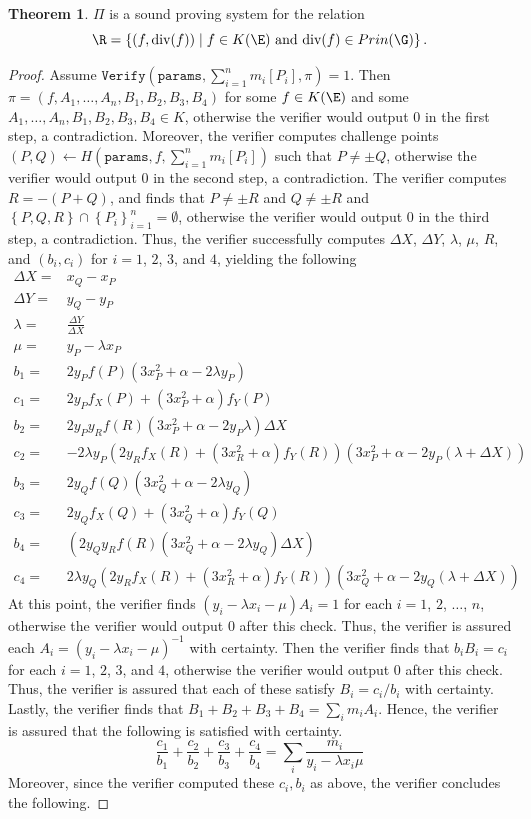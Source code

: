 \documentclass[11pt,letterpaper]{article}
\newcommand{\free}[1]{{\textcolor{red}{#1}}}
\theoremstyle{definition}
\newtheorem{theorem}{Theorem}
\newcommand{\6}{\mathbf}
\newcommand{\7}{\mathcal}
\begin{document}
\begin{theorem}\label{thm:DivisorSoundness}
$\Pi$ is a sound proving system for the relation 
$$\R = \left\{(f, \text{div}(f)) \mid f \in K(\E) \text{ and } \text{div}(f) \in Prin(\G) \right\}.$$
\end{theorem}
\begin{proof}
Assume $\texttt{Verify}(\texttt{params}, \sum_{i=1}^{n} m_i [P_i], \pi) = 1$. Then $\pi = (f,  A_1, \ldots, A_n, B_1, B_2, B_3, B_4)$ for some $f \in K(\E)$ and some $A_1, \ldots, A_n, B_1, B_2, B_3, B_4 \in K$, otherwise the verifier would output $0$ in the first step, a contradiction. Moreover, the verifier computes challenge points $(P, Q) \leftarrow H(\texttt{params}, f, \sum_{i=1}^{n} m_i [P_i])$ such that $P \neq \pm Q$, otherwise the verifier would output $0$ in the second step, a contradiction.  The verifier computes $R = -(P + Q)$, and finds that $P \neq \pm R$ and $Q \neq \pm R$ and $\left\{P, Q, R\right\} \cap \left\{P_i\right\}_{i=1}^{n} = \emptyset$, otherwise the verifier would output $0$ in the third step, a contradiction. Thus, the verifier successfully computes $\Delta X$, $\Delta Y$, $\lambda$, $\mu$, $R$, and $(b_i, c_i)$ for $i=1$, $2$, $3$, and $4$, yielding the following 
\begin{align}
\Delta X =& x_Q - x_P \\
\Delta Y =& y_Q - y_P \\
\lambda =& \frac{\Delta Y}{\Delta X} \\
\mu =& y_P - \lambda x_P \\
b_1 =& 2y_Pf(P)(3x_P^2+\alpha-2\lambda y_P) \\
c_1 =& 2y_Pf_X(P) + (3x_P^2+\alpha) f_Y(P)\\
b_2 =& 2y_Py_Rf(R)(3x_P^2+\alpha-2y_P \lambda ) \Delta X\\
c_2 =& - 2\lambda y_P(2y_Rf_X(R) + (3x_R^2+\alpha) f_Y(R))(3x_P^2+\alpha - 2y_P(\lambda + \Delta X))\\
b_3 =& 2y_Qf(Q)(3x_Q^2+\alpha - 2\lambda y_Q)\\
c_3 =& 2y_Qf_X(Q) + (3x_Q^2+\alpha) f_Y(Q) \\
b_4 =& \left(2y_Qy_Rf(R)(3x_Q^2+\alpha  - 2\lambda y_Q) \Delta X\right)\\
c_4 =& 2\lambda y_Q(2y_Rf_X(R) + (3x_R^2+\alpha)f_Y(R))(3x_Q^2+\alpha - 2y_Q(\lambda + \Delta X))
\end{align}
At this point, the verifier finds $(y_i - \lambda x_i - \mu)A_i = 1$ for each $i=1$, $2$, $\ldots$, $n$, otherwise the verifier would output $0$ after this check. Thus, the verifier is assured each $A_i = (y_i - \lambda x_i - \mu)^{-1}$ with certainty.
Then the verifier finds that $b_iB_i = c_i$ for each $i=1$, $2$, $3$, and $4$, otherwise the verifier would output $0$ after this check. Thus, the verifier is assured that each of these satisfy $B_i = c_i/b_i$ with certainty. Lastly, the verifier finds that $B_1 + B_2 + B_3 + B_4 = \sum_i m_i A_i$. Hence, the verifier is assured that the following is satisfied with certainty.
\[\frac{c_1}{b_1} + \frac{c_2}{b_2} + \frac{c_3}{b_3} + \frac{c_4}{b_4} = \sum_i \frac{m_i}{y_i-\lambda x_i \mu}\]
Moreover, since the verifier computed these $c_i, b_i$ as above, the verifier concludes the following.


\end{proof}
\end{document}
